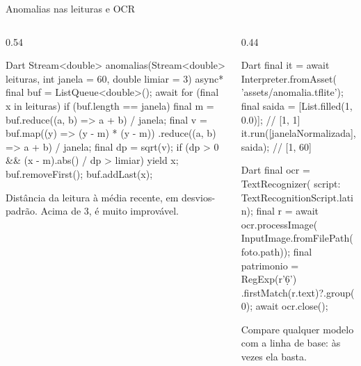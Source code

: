 \documentclass[aspectratio=169,10pt]{beamer}
\begin{document}
\begin{frame}[fragile]{Anomalias nas leituras e OCR}
  \begin{columns}[T]
    \begin{column}{0.54\textwidth}
\begin{codigo}[title=1) Linha de base: z-score em uma janela]{Dart}
Stream<double> anomalias(Stream<double> leituras,
    {int janela = 60, double limiar = 3}) async* {
  final buf = ListQueue<double>();
  await for (final x in leituras) {
    if (buf.length == janela) {
      final m = buf.reduce((a, b) => a + b) / janela;
      final v = buf.map((y) => (y - m) * (y - m))
          .reduce((a, b) => a + b) / janela;
      final dp = sqrt(v);
      if (dp > 0 && (x - m).abs() / dp > limiar) yield x;
      buf.removeFirst();
    }
    buf.addLast(x);
  }
}
\end{codigo}
      \begin{conceito}[z-score]
        Distância da leitura à média recente, em desvios-padrão. Acima de 3, é muito improvável.
      \end{conceito}
    \end{column}
    \begin{column}{0.44\textwidth}
\begin{codigo}[title=2) Modelo próprio (tflite\_flutter)]{Dart}
final it = await Interpreter.fromAsset(
    'assets/anomalia.tflite');
final saida = [List.filled(1, 0.0)];   // [1, 1]
it.run([janelaNormalizada], saida);    // [1, 60]
\end{codigo}
\begin{codigo}[title=3) OCR da placa do equipamento]{Dart}
final ocr = TextRecognizer(
    script: TextRecognitionScript.latin);
final r = await ocr.processImage(
    InputImage.fromFilePath(foto.path));
final patrimonio = RegExp(r'\d{6}')
    .firstMatch(r.text)?.group(0);
await ocr.close();
\end{codigo}
      \begin{dica}
        Compare qualquer modelo com a linha de base: às vezes ela basta.
      \end{dica}
    \end{column}
  \end{columns}
\end{frame}
\end{document}
